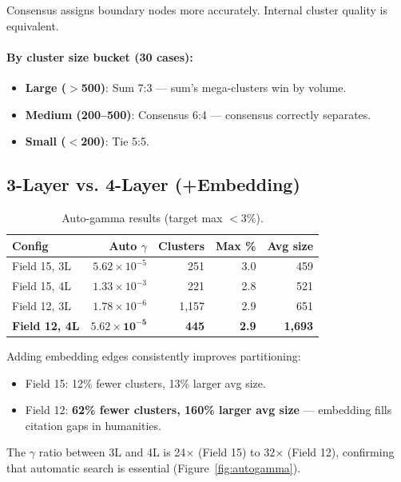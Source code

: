 \documentclass[11pt,a4paper]{article}
\begin{document}
Consensus assigns boundary nodes more accurately. Internal cluster quality is equivalent.

\paragraph{By cluster size bucket (30 cases):}
\begin{itemize}[nosep]
    \item \textbf{Large ($>$500)}: Sum 7:3 --- sum's mega-clusters win by volume.
    \item \textbf{Medium (200--500)}: Consensus 6:4 --- consensus correctly separates.
    \item \textbf{Small ($<$200)}: Tie 5:5.
\end{itemize}

\subsection{3-Layer vs. 4-Layer (+Embedding)}

\begin{table}[h]
\centering
\caption{Auto-gamma results (target max $< 3\%$).}
\begin{tabular}{lrrrr}
\toprule
Config & Auto $\gamma$ & Clusters & Max \% & Avg size \\
\midrule
Field 15, 3L & $5.62 \times 10^{-5}$ & 251 & 3.0 & 459 \\
Field 15, 4L & $1.33 \times 10^{-3}$ & 221 & 2.8 & 521 \\
\midrule
Field 12, 3L & $1.78 \times 10^{-6}$ & 1{,}157 & 2.9 & 651 \\
\textbf{Field 12, 4L} & $\mathbf{5.62 \times 10^{-5}}$ & \textbf{445} & \textbf{2.9} & \textbf{1{,}693} \\
\bottomrule
\end{tabular}
\end{table}

Adding embedding edges consistently improves partitioning:
\begin{itemize}[nosep]
    \item Field 15: 12\% fewer clusters, 13\% larger avg size.
    \item Field 12: \textbf{62\% fewer clusters, 160\% larger avg size} --- embedding fills citation gaps in humanities.
\end{itemize}

The $\gamma$ ratio between 3L and 4L is 24$\times$ (Field 15) to 32$\times$ (Field 12), confirming that automatic search is essential (Figure~\ref{fig:autogamma}).
\end{document}
